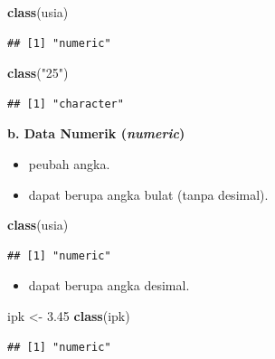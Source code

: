 \documentclass[
  12pt,
  a4paper,
]{scrbook}
\newenvironment{Shaded}{\begin{snugshade}}{\end{snugshade}}
\newcommand{\FloatTok}[1]{\textcolor[rgb]{0.00,0.00,0.81}{#1}}
\newcommand{\KeywordTok}[1]{\textcolor[rgb]{0.13,0.29,0.53}{\textbf{#1}}}
\newcommand{\NormalTok}[1]{#1}
\newcommand{\StringTok}[1]{\textcolor[rgb]{0.31,0.60,0.02}{#1}}
\providecommand{\tightlist}{%
  \setlength{\itemsep}{0pt}\setlength{\parskip}{0pt}}
\begin{document}
\begin{Shaded}
\begin{Highlighting}[]
\KeywordTok{class}\NormalTok{(usia)}
\end{Highlighting}
\end{Shaded}

\begin{verbatim}
## [1] "numeric"
\end{verbatim}

\begin{Shaded}
\begin{Highlighting}[]
\KeywordTok{class}\NormalTok{(}\StringTok{"25"}\NormalTok{)}
\end{Highlighting}
\end{Shaded}

\begin{verbatim}
## [1] "character"
\end{verbatim}

\textbf{b. Data Numerik (\emph{numeric})}

\begin{itemize}
\tightlist
\item
  peubah angka.
\item
  dapat berupa angka bulat (tanpa desimal).
\end{itemize}

\begin{Shaded}
\begin{Highlighting}[]
\KeywordTok{class}\NormalTok{(usia)}
\end{Highlighting}
\end{Shaded}

\begin{verbatim}
## [1] "numeric"
\end{verbatim}

\begin{itemize}
\tightlist
\item
  dapat berupa angka desimal.
\end{itemize}

\begin{Shaded}
\begin{Highlighting}[]
\NormalTok{ipk <-}\StringTok{ }\FloatTok{3.45}
\KeywordTok{class}\NormalTok{(ipk)}
\end{Highlighting}
\end{Shaded}

\begin{verbatim}
## [1] "numeric"
\end{verbatim}
\end{document}

